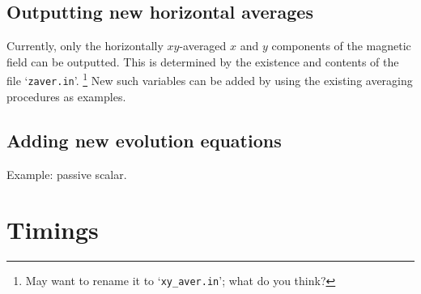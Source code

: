 \documentclass[12pt,twoside,notitlepage,a4paper]{article}
\newcommand{\file}[1]{`\texttt{#1}'}
\begin{document}
\subsection{Outputting new horizontal averages}

Currently, only the horizontally $xy$-averaged $x$ and $y$ components
of the magnetic field can be outputted. This is determined by the existence
and contents of the file \file{zaver.in}.
\footnote{May want to rename it to \file{xy\_aver.in}; what do you think?}
New such variables can be added by using the existing averaging
procedures as examples.

\subsection{Adding new evolution equations}

Example: passive scalar.


\section{Timings}
\end{document}
